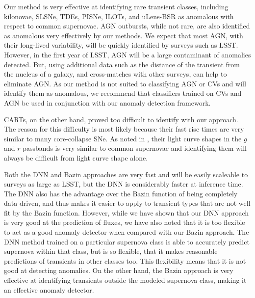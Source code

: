\documentclass[fleqn,usenatbib]{mnras}
\begin{document}
Our method is very effective at identifying rare transient classes, including kilonovae, SLSNe, TDEs, PISNe, ILOTs, and uLens-BSR as anomalous with respect to common supernovae. AGN outbursts, while not rare, are also identified as anomalous very effectively by our methods. We expect that most AGN, with their long-lived variability, will be quickly identified by surveys such as LSST. However, in the first year of LSST, AGN will be a large contaminant of anomalies detected. But, using additional data such as the distance of the transient from the nucleus of a galaxy, and cross-matches with other surveys, can help to eliminate AGN. As our method is not suited to classifying AGN or CVs and will identify them as anomalous, we recommend that classifiers trained on CVs and AGN be used in conjunction with our anomaly detection framework.

CARTs, on the other hand, proved too difficult to identify with our approach. The reason for this difficulty is most likely because their fast rise times are very similar to many core-collapse SNe. As noted in \citet{Muthukrishna19RAPID}, their light curve shapes in the $g$ and $r$ passbands is very similar to common supernovae and identifying them will always be difficult from light curve shape alone.

Both the DNN and Bazin approaches are very fast and will be easily scaleable to surveys as large as LSST, but the DNN is considerably faster at inference time. The DNN also has the advantage over the Bazin function of being completely data-driven, and thus makes it easier to apply to transient types that are not well fit by the Bazin function.
However, while we have shown that our DNN approach is very good at the prediction of fluxes, we have also noted that it is too flexible to act as a good anomaly detector when compared with our Bazin approach. The DNN method trained on a particular supernova class is able to accurately predict supernova within that class, but is so flexible, that it makes reasonable predictions of transients in other classes too. This flexibility means that it is not good at detecting anomalies. On the other hand, the Bazin approach is very effective at identifying transients outside the modeled supernova class, making it an effective anomaly detector. 
\end{document}
